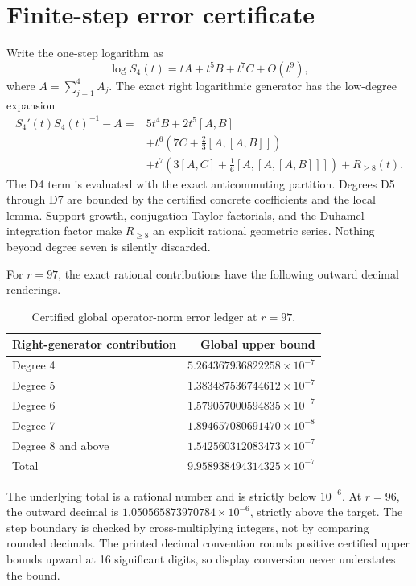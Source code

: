 \documentclass[11pt]{article}
\begin{document}
\section{Finite-step error certificate}

Write the one-step logarithm as
\begin{equation}
  \log S_4(t)=tA+t^5B+t^7C+O(t^9),
\end{equation}
where $A=\sum_{j=1}^4 A_j$.  The exact right logarithmic generator has the
low-degree expansion
\begin{align}
 S_4'(t)S_4(t)^{-1}-A
 ={}&5t^4B+2t^5[A,B] \\
 &+t^6\!\left(7C+\frac23[A,[A,B]]\right) \\
 &+t^7\!\left(3[A,C]+\frac16[A,[A,[A,B]]]\right)
 +R_{\ge8}(t).
 \label{eq:rightgenerator}
\end{align}
The D4 term is evaluated with the exact anticommuting partition.  Degrees D5
through D7 are bounded by the certified concrete coefficients and the local
lemma.  Support growth, conjugation Taylor factorials, and the Duhamel
integration factor make $R_{\ge8}$ an explicit rational geometric series.
Nothing beyond degree seven is silently discarded.

For $r=97$, the exact rational contributions have the following outward
decimal renderings.

\begin{table}[ht]
\centering
\caption{Certified global operator-norm error ledger at $r=97$.}
\label{tab:errorledger}
\begin{tabular}{@{}lr@{}}
\toprule
Right-generator contribution & Global upper bound \\
\midrule
Degree 4 & $5.264367936822258\times10^{-7}$ \\
Degree 5 & $1.383487536744612\times10^{-7}$ \\
Degree 6 & $1.579057000594835\times10^{-7}$ \\
Degree 7 & $1.894657080691470\times10^{-8}$ \\
Degree 8 and above & $1.542560312083473\times10^{-7}$ \\
\midrule
Total & $9.958938494314325\times10^{-7}$ \\
\bottomrule
\end{tabular}
\end{table}

The underlying total is a rational number and is strictly below $10^{-6}$.
At $r=96$, the outward decimal is
$1.050565873970784\times10^{-6}$, strictly above the target.  The step boundary
is checked by cross-multiplying integers, not by comparing rounded decimals.
The printed decimal convention rounds positive certified upper bounds upward
at 16 significant digits, so display conversion never understates the bound.
\end{document}
